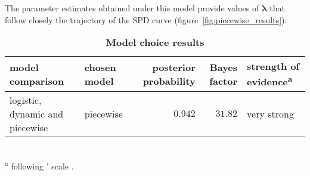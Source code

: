 \documentclass[a4paper]{article}
\begin{document}
The parameter estimates obtained under this model provide values of $\bm{\lambda}$ that follow closely the trajectory of the SPD curve (figure~\ref{fig:piecewise_results}). 
\\










\begin{table}[tbh]
\caption{\textbf{Model choice results}}
\label{tab:model_choice}
\small
\begin{tabularx}{0.95\textwidth}{>{\raggedright}X l r r l}
\hline
model comparison & chosen model & posterior probability & Bayes factor & strength of evidence\textsuperscript{a} \\
\hline\hline
logistic, dynamic and piecewise & piecewise & $0.942$ &  $31.82$ & very strong \\
\hline
\end{tabularx}\\
\footnotesize{\textsuperscript{a} following \citeauthor{Jeffreys1961}' scale \parencite*{Jeffreys1961}.}\\
\end{table}
\end{document}

